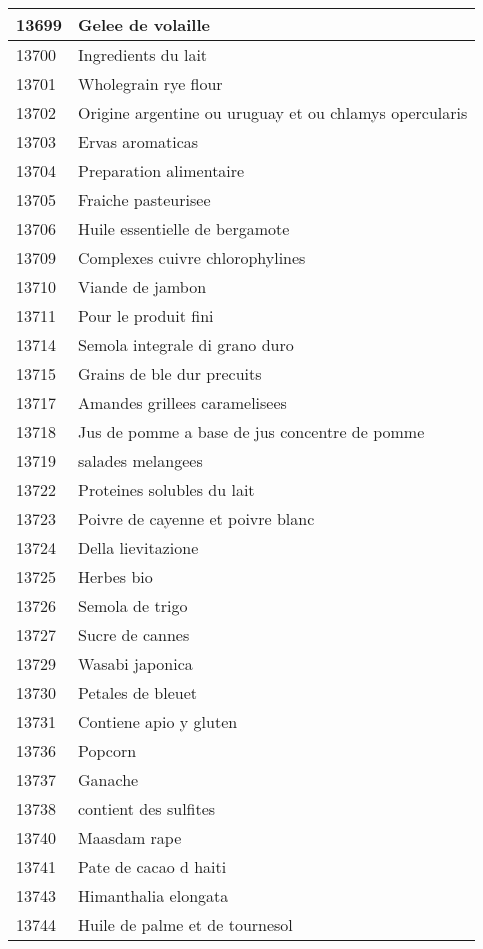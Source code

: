 \begin{longtable}{|l|l|}
13699 & Gelee de volaille \\ \hline 
13700 & Ingredients du lait \\ \hline 
13701 & Wholegrain rye flour \\ \hline 
13702 & Origine argentine ou uruguay et ou chlamys opercularis \\ \hline 
13703 & Ervas aromaticas \\ \hline 
13704 & Preparation alimentaire \\ \hline 
13705 & Fraiche pasteurisee \\ \hline 
13706 & Huile essentielle de bergamote \\ \hline 
13709 & Complexes cuivre chlorophylines \\ \hline 
13710 & Viande de jambon \\ \hline 
13711 & Pour le produit fini \\ \hline 
13714 & Semola integrale di grano duro \\ \hline 
13715 & Grains de ble dur precuits \\ \hline 
13717 & Amandes grillees caramelisees \\ \hline 
13718 & Jus de pomme a base de jus concentre de pomme \\ \hline 
13719 & salades melangees \\ \hline 
13722 & Proteines solubles du lait \\ \hline 
13723 & Poivre de cayenne et poivre blanc \\ \hline 
13724 & Della lievitazione \\ \hline 
13725 & Herbes bio \\ \hline 
13726 & Semola de trigo \\ \hline 
13727 & Sucre de cannes \\ \hline 
13729 & Wasabi japonica \\ \hline 
13730 & Petales de bleuet \\ \hline 
13731 & Contiene apio y gluten \\ \hline 
13736 & Popcorn \\ \hline 
13737 & Ganache \\ \hline 
13738 & contient des sulfites \\ \hline 
13740 & Maasdam rape \\ \hline 
13741 & Pate de cacao d haiti \\ \hline 
13743 & Himanthalia elongata \\ \hline 
13744 & Huile de palme et de tournesol \\ \hline 

\end{longtable}
